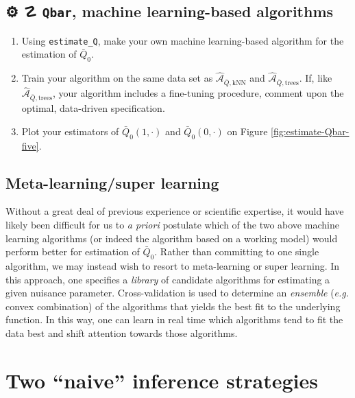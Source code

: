 \documentclass[11pt,openright,twoside]{book}
\newcommand{\gear}{\usebox{\gearbox}\;}
\DeclareRobustCommand{\stixdanger}{%
  {\usefont{U}{stixbbit}{m}{it}\symbol{"F6}}%
}
\newcommand{\Algo}{\widehat{\mathcal{A}}}
\newcommand{\Qbar}{\bar{Q}}
\theoremstyle{definition}
\theoremstyle{definition}
\theoremstyle{definition}
\theoremstyle{remark}
\begin{document}
\hypertarget{nuisance-Qbar-ml-exo}{%
\section{\texorpdfstring{⚙ \gear ☡ \stixdanger{} \texttt{Qbar}, machine learning-based algorithms}{⚙ ☡  Qbar, machine learning-based algorithms}}\label{nuisance-Qbar-ml-exo}}

\begin{enumerate}
\def\labelenumi{\arabic{enumi}.}
\item
  Using \texttt{estimate\_Q}, make your own machine learning-based algorithm for the
  estimation of \(\Qbar_{0}\).
\item
  Train your algorithm on the same data set as \(\Algo_{\Qbar,\text{kNN}}\) and
  \(\Algo_{\Qbar,\text{trees}}\). If, like \(\Algo_{\Qbar,\text{trees}}\), your
  algorithm includes a fine-tuning procedure, comment upon the optimal,
  data-driven specification.
\item
  Plot your estimators of \(\Qbar_{0}(1,\cdot)\) and \(\Qbar_{0}(0,\cdot)\) on
  Figure \ref{fig:estimate-Qbar-five}.
\end{enumerate}

\hypertarget{meta-learning}{%
\section{Meta-learning/super learning}\label{meta-learning}}

Without a great deal of previous experience or scientific expertise, it would
have likely been difficult for us to \emph{a priori} postulate which of the two
above machine learning algorithms (or indeed the algorithm based on a working
model) would perform better for estimation of \(\bar{Q}_0\). Rather than
committing to one single algorithm, we may instead wish to resort to
meta-learning or super learning. In this approach, one specifies a \emph{library}
of candidate algorithms for estimating a given nuisance parameter.
Cross-validation is used to determine an \emph{ensemble} (\emph{e.g.} convex
combination) of the algorithms that yields the best fit to the underlying
function. In this way, one can learn in real time which algorithms tend to
fit the data best and shift attention towards those algorithms.



\hypertarget{naive-estimators}{%
\chapter{Two ``naive'' inference strategies}\label{naive-estimators}}
\end{document}
